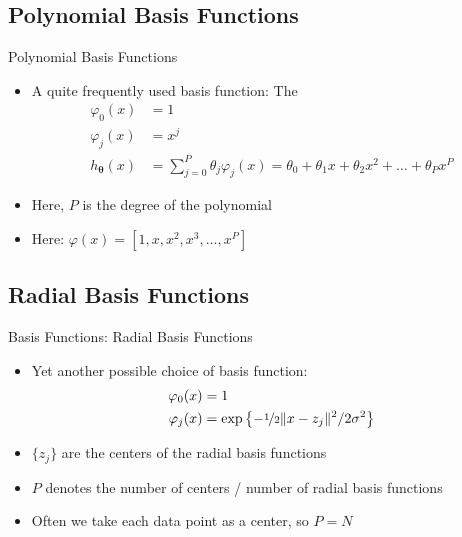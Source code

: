\subsection{Polynomial Basis Functions}

\begin{frame}{Polynomial Basis Functions}{}
	\begin{itemize}
		\item A quite frequently used basis function: The 
		\begin{align*}
			\varphi_0(x) 			&= 1 	\\
			\varphi_j(x) 			&= x^j	\\
			h_{\bm{\theta}}(x) 	&= \sum_{j=0}^P \theta_j \varphi_j(x) = \theta_0 + \theta_1 x +
									\theta_2 x^2 + \dots + \theta_P x^P
		\end{align*}
		\item Here, $P$ is the degree of the polynomial
		\item Here: $\varphi(x) = [1, x, x^2, x^3, \dots, x^P]$
	\end{itemize}
\end{frame}


\subsection{Radial Basis Functions}

\begin{frame}{Basis Functions: Radial Basis Functions}{}
	\begin{itemize}
		\item Yet another possible choice of basis function: 
		\begin{align}
			\varphi_0(x) 	&= 1 \\
			\varphi_j(x) 	&= \exp\left\{ - \nicefrac{1}{2} \Vert x - z_j \Vert^2 / 2 \sigma^2 \right\}
		\end{align}
		\item $\{z_j\}$ are the centers of the radial basis functions
		\item $P$ denotes the number of centers / number of radial basis functions
		\item Often we take each data point as a center, so $P = N$
	\end{itemize}
\end{frame}


